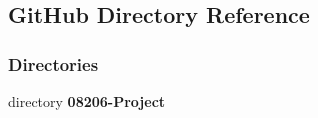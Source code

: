 \subsection{Git\+Hub Directory Reference}
\label{dir_9c4a0dec6232ecb53864e56bb56734af}
\subsubsection*{Directories}
\begin{DoxyCompactItemize}
\item 
directory \textbf{ 08206-\/\+Project}
\end{DoxyCompactItemize}
